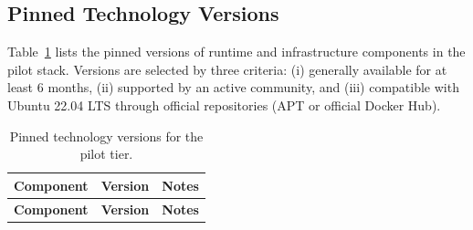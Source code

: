 \subsection{Pinned Technology Versions}
\label{appendix:tech-versions}

Table~\ref{tab:tech-versions} lists the pinned versions of runtime and
infrastructure components in the pilot stack. Versions are selected by
three criteria: (i) generally available for at least 6 months, (ii)
supported by an active community, and (iii) compatible with Ubuntu
22.04 LTS through official repositories (APT or official Docker Hub).

\begin{longtable}{|p{4.3cm}|p{3.7cm}|p{5.5cm}|}
\caption{Pinned technology versions for the pilot tier.}
\label{tab:tech-versions} \\
\hline
\textbf{Component} & \textbf{Version} & \textbf{Notes} \\
\hline
\endfirsthead
\hline
\textbf{Component} & \textbf{Version} & \textbf{Notes} \\
\hline
\endhead


\end{longtable}
